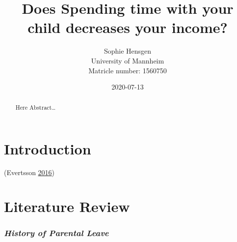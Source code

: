 \documentclass[
  12pt,
]{article}
\title{\vspace{1cm}Does Spending time with your child decreases your income?\vspace{0.5cm}\\}
\author{Sophie Hensgen\\
University of Mannheim\\
Matricle number: 1560750}
\date{2020-07-13\\}
\begin{document}
\maketitle
\begin{abstract}
\noindent{}Here Abstract\ldots{}\vspace{.8cm}
\end{abstract}

\hypertarget{introduction}{%
\section{Introduction}\label{introduction}}

(Evertsson \protect\hyperlink{ref-evertsson_parental_2016}{2016})

\hypertarget{literature-review}{%
\section{Literature Review}\label{literature-review}}

\hypertarget{history-of-parental-leave}{%
\subsubsection*{\texorpdfstring{\emph{History of Parental Leave}}{History of Parental Leave}}\label{history-of-parental-leave}}
\end{document}
